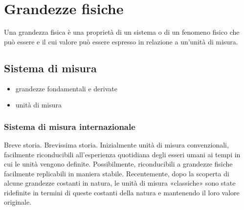 \documentclass[letterpaper,10pt,italian]{jupyterBook}
\begin{document}
\sphinxstepscope


\chapter{Grandezze fisiche}
\label{\detokenize{ch/intro/physical_quantities:grandezze-fisiche}}\label{\detokenize{ch/intro/physical_quantities:physics-hs-intro-physical-quantities}}\label{\detokenize{ch/intro/physical_quantities::doc}}
\sphinxAtStartPar
Una grandezza fisica è una proprietà di un sistema o di un fenomeno fisico che può essere {\hyperref[\detokenize{ch/intro/measurements:physics-hs-intro-measurements}]{}} e il cui valore può essere espresso in relazione a un’unità di misura.


\section{Sistema di misura}
\label{\detokenize{ch/intro/physical_quantities:sistema-di-misura}}\begin{itemize}
\item {} 
\sphinxAtStartPar
grandezze fondamentali e derivate

\item {} 
\sphinxAtStartPar
unità di misura

\end{itemize}


\subsection{Sistema di misura internazionale}
\label{\detokenize{ch/intro/physical_quantities:sistema-di-misura-internazionale}}
\sphinxAtStartPar
Breve storia.
Brevissima storia. Inizialmente unità di misura convenzionali, facilmente riconducibili all’esperienza quotidiana degli esseri umani ai tempi in cui le unità vengono definite.
Possibilmente, riconducibili a grandezze fisiche facilmente replicabili in maniera stabile. Recentemente, dopo la scoperta di alcune grandezze costanti in natura, le unità di misura «classiche» sono state ri\sphinxhyphen{}definite in termini di queste costanti della natura e mantenendo il loro valore originale.

\sphinxAtStartPar
{}

\sphinxAtStartPar
{}

\sphinxAtStartPar
{}
\end{document}
